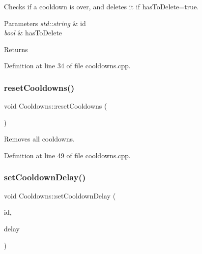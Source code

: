 Checks if a cooldown is over, and deletes it if has\+To\+Delete=true. 


\begin{DoxyParams}{Parameters}
{\em std\+::string} & id \\
\hline
{\em bool} & has\+To\+Delete \\
\hline
\end{DoxyParams}
\begin{DoxyReturn}{Returns}

\end{DoxyReturn}


Definition at line 34 of file cooldowns.\+cpp.

\mbox{\label{classns_game_1_1_cooldowns_a820c7d29780f60b9f5ac5440e134de2e}} 
\subsubsection{\texorpdfstring{reset\+Cooldowns()}{resetCooldowns()}}
{\footnotesize\ttfamily void Cooldowns\+::reset\+Cooldowns (\begin{DoxyParamCaption}{ }\end{DoxyParamCaption})\hspace{0.3cm}{\ttfamily [static]}}



Removes all cooldowns. 



Definition at line 49 of file cooldowns.\+cpp.

\mbox{\label{classns_game_1_1_cooldowns_a0db5b81efac93aacc0b12b2aa520620b}} 
\subsubsection{\texorpdfstring{set\+Cooldown\+Delay()}{setCooldownDelay()}}
{\footnotesize\ttfamily void Cooldowns\+::set\+Cooldown\+Delay (\begin{DoxyParamCaption}\item[{std\+::string}]{id,  }\item[{unsigned}]{delay }\end{DoxyParamCaption})\hspace{0.3cm}{\ttfamily [static]}}



